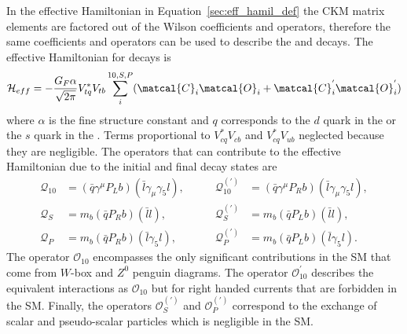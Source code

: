 {{%
In the effective Hamiltonian in Equation~\ref{sec:eff_hamil_def} the CKM matrix elements are factored out of the Wilson coefficients and operators, therefore the same coefficients and operators can be used to describe the \bd and \bs decays.
The effective Hamiltonian for \bmumu decays is~\cite{DeBruyn:2012wk}
\begin{equation}
\mathcal{H}_{eff} = -\frac{G_F \alpha}{\sqrt{2\pi}} V_{tq}^{*}V_{tb} \displaystyle\sum_{i}^{10,S,P} (\matcal{C}_i\matcal{O}_i + \matcal{C}^{'}_{i}\matcal{O}_{i}^{'})
\label{eq:eff_hamil_bmumu}
\end{equation}
where $\alpha$ is the fine structure constant and $q$ corresponds to the $d$ quark in the \bd or the $s$ quark in the \bs. Terms proportional to $V^*_{cq}V_{cb}$ and $V^*_{cq}V_{ub}$ neglected because they are negligible. The operators that can contribute to the \bmumu effective Hamiltonian due to the initial and final decay states are
\begin{align}
 \mathcal{Q}_{10}&=(\bar{q}\gamma^{\mu}P_{L}b)(\bar{l}\gamma_{\mu}\gamma_{5}l), &\qquad
 \mathcal{Q}_{10}^{(')}&= (\bar{q}\gamma^{\mu}P_{R}b)(\bar{l}\gamma_{\mu}\gamma_{5}l), \\
 \mathcal{Q}_{S}&= m_{b}(\bar{q}P_{R}b)(\bar{l}l),  &\qquad
\mathcal{Q}_{S}^{(')}&= m_{b}(\bar{q}P_{L}b)(\bar{l}l), \\
 \mathcal{Q}_{P}&= m_{b}(\bar{q}P_{R}b)(\bar{l}\gamma_{5}l), &\qquad
 \mathcal{Q}_{P}^{(')}&= m_{b}(\bar{q}P_{L}b)(\bar{l}\gamma_{5}l).
\end{align}
The operator $\mathcal{O}_{10}$ encompasses the only significant contributions in the SM that come from $W$-box and $Z^0$ penguin diagrams. The operator $\mathcal{O}_{10}^'$ describes the equivalent interactions as $\mathcal{O}_{10}$ but for right handed currents that are forbidden in the SM. %
 Finally, the operators $\mathcal{O}_{S}^{(')}$ and $\mathcal{O}_{P}^{(')}$ correspond to the exchange of scalar and pseudo-scalar particles which is negligible in the SM. 

}}
